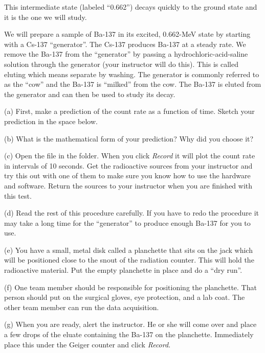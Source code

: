 This intermediate state (labeled ``0.662'') decays quickly to the ground state and
it is the one we will study.

We will prepare a sample of Ba-137 in its excited, 0.662-MeV state 
by starting with a Cs-137 ``generator''.
The Cs-137 produces
Ba-137 at a steady rate. We remove the Ba-137 from the ``generator''
by passing a hydrochloric-acid-saline solution through the generator
(your instructor will do this). This is called eluting which means separate by
washing. The generator is commonly referred to as the ``cow''
and the Ba-137 is ``milked'' from the cow.
The Ba-137 is eluted from the generator and can then be used to study its
decay.


(a) First, make a prediction of the count rate as a function of time.
Sketch your prediction in the space below.

\vspace{1.5in}

(b) What is the mathematical form of your prediction? Why did you choose it?

\vspace{1.5in}

(c) Open the  file in the \filename{\coursefolder} folder. 
When you click \textit{Record}
it will plot the count rate in intervals of 10 seconds.
Get the radioactive sources from your instructor and
try this out with one of them
to make sure you know how to use the hardware and software.
Return the sources to your instructor when you are finished with this test.

(d) Read the rest of this procedure carefully. 
If you have to redo the procedure it may take a long time for the ``generator'' to
produce enough Ba-137 for you to use.

(e) You have a small, metal disk called a planchette that sits on the 
jack which will be positioned close to the snout of the radiation counter.
This will hold the radioactive material.
Put the empty planchette in place and do a ``dry run''.

(f) One team member should be responsible for positioning the planchette.
That person should put on the surgical gloves, eye protection, and a lab coat.
The other team member can run the data acquisition.

(g) When you are ready, alert the instructor. He or she will come over and place 
a few drops of the eluate containing the Ba-137 on the planchette.
Immediately place this under the Geiger counter and
click \textit{Record}.

